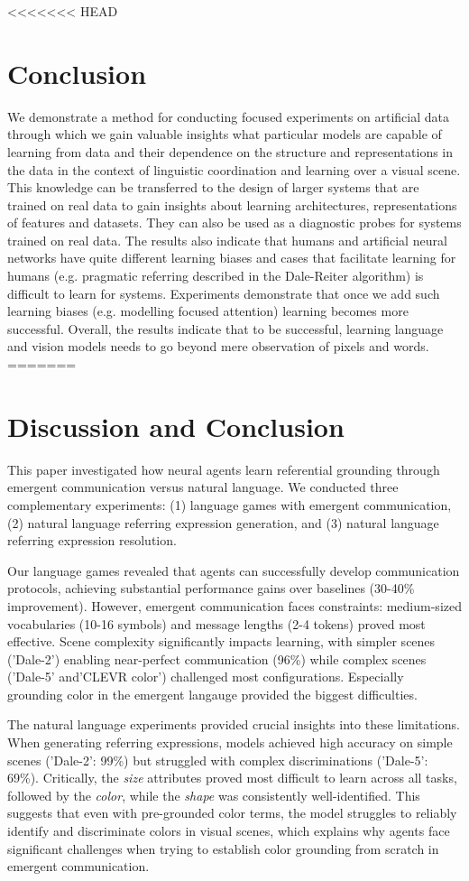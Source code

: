 \documentclass[11pt]{article}
\begin{document}
<<<<<<< HEAD
\section{%
  Conclusion}

We demonstrate a method for conducting focused experiments on artificial data through which we gain valuable insights what particular models are capable of learning from data and their dependence on the structure and representations in the data in the context of linguistic coordination and learning over a visual scene.
This knowledge can be transferred to the design of larger systems that are trained on real data to gain insights about learning architectures, representations of features and datasets.
They can also be used as a diagnostic probes for systems trained on real data.
The results also indicate that humans and artificial neural networks have quite different learning biases and cases that facilitate learning for humans (e.g. pragmatic referring described in the Dale-Reiter algorithm) is difficult to learn for systems.
Experiments demonstrate that once we add such learning biases (e.g. modelling focused attention) learning becomes more successful.
Overall, the results indicate that to be successful, learning language and vision models needs to go beyond mere observation of pixels and words.
=======
\section{Discussion and Conclusion}
This paper investigated how neural agents learn referential grounding through emergent communication versus natural language.
We conducted three complementary experiments: (1) language games with emergent communication, (2) natural language referring expression generation, and (3) natural language referring expression resolution.

Our language games revealed that agents can successfully develop communication protocols, achieving substantial performance gains over baselines (30-40\% improvement).
However, emergent communication faces constraints: medium-sized vocabularies (10-16 symbols) and message lengths (2-4 tokens) proved most effective.
Scene complexity significantly impacts learning, with simpler scenes ('Dale-2') enabling near-perfect communication (96\%) while complex scenes ('Dale-5' and'CLEVR color') challenged most configurations.
Especially grounding color in the emergent langauge provided the biggest difficulties.

The natural language experiments provided crucial insights into these limitations.
When generating referring expressions, models achieved high accuracy on simple scenes ('Dale-2': 99\%) but struggled with complex discriminations ('Dale-5': 69\%).
Critically, the \emph{size} attributes proved most difficult to learn across all tasks, followed by the \emph{color}, while the \emph{shape} was consistently well-identified.
This suggests that even with pre-grounded color terms, the model struggles to reliably identify and discriminate colors in visual scenes, which explains why agents face significant challenges when trying to establish color grounding from scratch in emergent communication.
\end{document}
